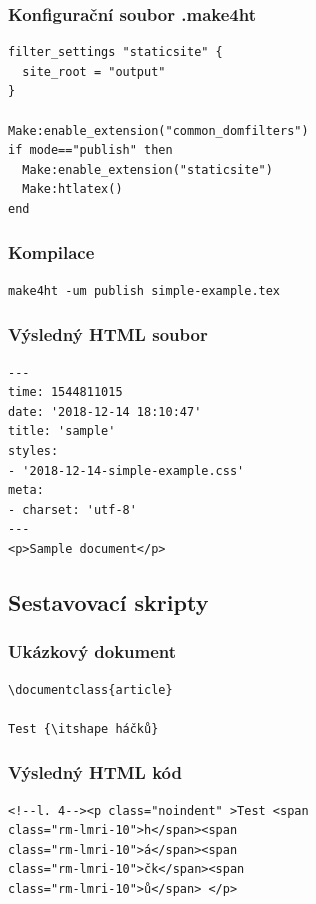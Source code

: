 \begin{frame}[fragile]
  \frametitle{Konfigurační soubor .make4ht}
  \begin{priklad}
\begin{verbatim}
filter_settings "staticsite" {
  site_root = "output" 
}

Make:enable_extension("common_domfilters")
if mode=="publish" then
  Make:enable_extension("staticsite")
  Make:htlatex()
end
\end{verbatim}
\end{priklad}

\end{frame}

\begin{frame}[fragile]

  \frametitle{Kompilace}

  \begin{priklad}
\begin{verbatim}
make4ht -um publish simple-example.tex
\end{verbatim}
\end{priklad}
\end{frame}

\begin{frame}[fragile]
  \frametitle{Výsledný HTML soubor}
  \begin{priklad}
\begin{verbatim}
---
time: 1544811015
date: '2018-12-14 18:10:47'
title: 'sample'
styles:
- '2018-12-14-simple-example.css'
meta:
- charset: 'utf-8'
---
<p>Sample document</p>
\end{verbatim}
\end{priklad}
\end{frame}

\subsection{Sestavovací skripty}
\begin{frame}[fragile]

\frametitle{Ukázkový dokument}
\begin{priklad}
\begin{verbatim}
\documentclass{article}

Test {\itshape háčků}

\end{verbatim}
\end{priklad}
\end{frame}

\begin{frame}[fragile]
  \frametitle{Výsledný HTML kód}
\begin{priklad}
\begin{verbatim}
<!--l. 4--><p class="noindent" >Test <span 
class="rm-lmri-10">h</span><span 
class="rm-lmri-10">á</span><span 
class="rm-lmri-10">čk</span><span 
class="rm-lmri-10">ů</span> </p> 
\end{verbatim}
\end{priklad}

\end{frame}



